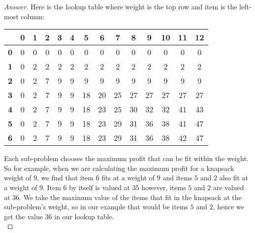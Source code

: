 \documentclass[11pt]{article}
\theoremstyle{definition}
\theoremstyle{definition}
\theoremstyle{definition}
\begin{document}
\begin{proof}[Answer]
Here is the lookup table where weight is the top row and item is the left-most column:\\
\begin{center}
 \begin{tabular}{r|c|c|c|c|c|c|c|c|c|c|c|c|c}
	&\textbf{0}  & \textbf{1}  & \textbf{2} &\textbf{3} &\textbf{4} &\textbf{5} &\textbf{6} &\textbf{7}& \textbf{8} &\textbf{9} &\textbf{10} & \textbf{11} &\textbf{12} \\
	\hline
	\textbf{0} &0 &0 &0 &0 &0 &0 &0 &0 &0 &0 &0 &0 &0\\
	\hline
	\textbf{1} &0 &2 & 2& 2&2 &2 &2 &2 &2 &2 &2 &2 &2\\
	\hline
	\textbf{2} &0 & 2 & 7  & 9& 9& 9& 9 &9 &9 &9 &9 &9 &9\\
	\hline
	\textbf{3} &0 & 2 & 7  & 9& 9& 18& 20 &25 &27 &27 &27 &27 &27\\
	\hline
	\textbf{4} &0 & 2 & 7  & 9& 9& 18& 23 &25 &30 &32 &32 &41 &43\\
	\hline
	\textbf{5} &0 & 2 & 7  & 9& 9& 18& 23 &29 &31 &36 &38 &41 &47\\
	\hline
	\textbf{6} &0 & 2 & 7  & 9& 9& 18& 23 &29 &31 &36 &38 &42 &47 \\
	
\end{tabular}
\end{center}


Each sub-problem chooses the maximum profit that can be fit within the weight. So for example, when we are calculating the maximum profit for a knapsack weight of $9$, we find that item $6$ fits at a weight of $9$ and items $5$ and $2$ also fit at a weight of $9$. Item $6$ by itself is valued at $35$ however, items $5$ and $2$ are valued at $36$. We take the maximum value of the items that fit in the knapsack at the sub-problem's weight, so in our example that would be items $5$ and $2$, hence we get the value $36$ in our lookup table.\\

\end{proof}
\end{document}

